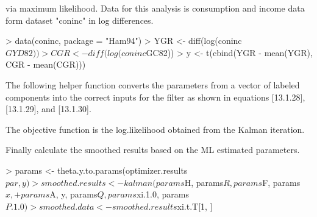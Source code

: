via maximum likelihood.  Data for this analysis is consumption and income data form dataset "coninc" in log differences.
\begin{Schunk}
\begin{Sinput}
> data(coninc, package = "Ham94")
> YGR <- diff(log(coninc$GYD82))
> CGR <- diff(log(coninc$GC82))
> y <- t(cbind(YGR - mean(YGR), CGR - mean(CGR)))
\end{Sinput}
\end{Schunk}
The following helper function converts the parameters from a vector of labeled
components into the correct inputs for the filter as shown in equations [13.1.28], [13.1.29], and [13.1.30].
\begin{Schunk}
\end{Schunk}
The objective function is the log.likelihood obtained from the Kalman iteration.
\begin{Schunk}
\end{Schunk}
Finally calculate the smoothed results based on the ML estimated parameters.
\begin{Schunk}
\begin{Sinput}
> params <- theta.y.to.params(optimizer.results$par, y)
> smoothed.results <- kalman(params$H, params$R, params$F, params$x, 
+     params$A, y, params$Q, params$xi.1.0, params$P.1.0)
> smoothed.data <- smoothed.results$xi.t.T[1, ]
\end{Sinput}
\end{Schunk}
